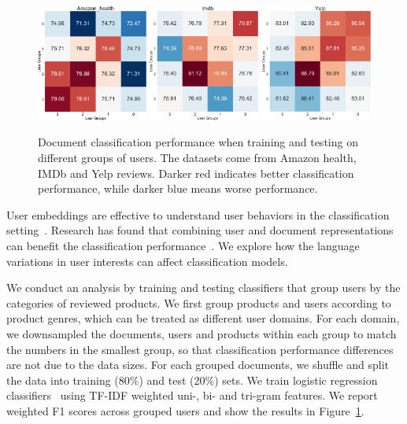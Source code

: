 \begin{figure}[t]
\centering
\includegraphics[width=0.325\textwidth]{./images/chapter4/uembedding/amazon_health_group.pdf}
\includegraphics[width=0.325\textwidth]{./images/chapter4/uembedding/imdb_group.pdf}
\includegraphics[width=0.325\textwidth]{./images/chapter4/uembedding/yelp_group.pdf}
\caption{Document classification performance when training and testing on different groups of users. The datasets come from Amazon health, IMDb and Yelp reviews. Darker red indicates better classification performance, while darker blue means worse performance.}
\label{chap4:fig:group}
\end{figure}

User embeddings are effective to understand user behaviors in the classification setting~\cite{amir2016modelling, ding2018predicting}.
Research has found that combining user and document representations can benefit the classification performance~\cite{yuan2019neural}.
We explore how the language variations in user interests can affect classification models.

We conduct an analysis by training and testing classifiers that group users by the categories of reviewed products.
We first group products and users according to product genres, which can be treated as different user domains. 
For each domain, we downsampled the documents, users and products within each group to match the numbers in the smallest group, so that classification performance differences are not due to the data sizes.
For each grouped documents, we shuffle and split the data into training (80\%) and test (20\%) sets. We train logistic regression classifiers~\cite{pedregosa2011scikit} using TF-IDF weighted uni-, bi- and tri-gram features. 
We report weighted F1 scores across grouped users and show the results in Figure~\ref{chap4:fig:group}.

